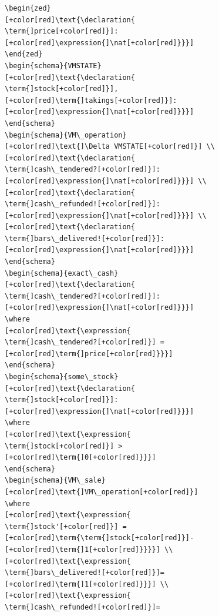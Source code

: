 \begin{figure}[H]
\centering
\begin{minipage}{0.45\textwidth}
\centering
\begin{tiny}
\begin{BVerbatim}[commandchars=+\[\]]
\begin{zed}
[+color[red]\text{\declaration{
\term{]price[+color[red]}]:[+color[red]\expression{]\nat[+color[red]}}}]
\end{zed}
\begin{schema}{VMSTATE}
[+color[red]\text{\declaration{
\term{]stock[+color[red]}], [+color[red]\term{]takings[+color[red]}]:
[+color[red]\expression{]\nat[+color[red]}}}]
\end{schema}
\begin{schema}{VM\_operation}
[+color[red]\text{]\Delta VMSTATE[+color[red]}] \\
[+color[red]\text{\declaration{
\term{]cash\_tendered?[+color[red]}]:[+color[red]\expression{]\nat[+color[red]}}}] \\
[+color[red]\text{\declaration{
\term{]cash\_refunded![+color[red]}]:[+color[red]\expression{]\nat[+color[red]}}}] \\
[+color[red]\text{\declaration{
\term{]bars\_delivered![+color[red]}]:[+color[red]\expression{]\nat[+color[red]}}}]
\end{schema}
\begin{schema}{exact\_cash}
[+color[red]\text{\declaration{
\term{]cash\_tendered?[+color[red]}]:[+color[red]\expression{]\nat[+color[red]}}}]
\where
[+color[red]\text{\expression{
\term{]cash\_tendered?[+color[red]}] = [+color[red]\term{]price[+color[red]}}}]
\end{schema}
\begin{schema}{some\_stock}
[+color[red]\text{\declaration{
\term{]stock[+color[red]}]:[+color[red]\expression{]\nat[+color[red]}}}]
\where
[+color[red]\text{\expression{
\term{]stock[+color[red]}] > [+color[red]\term{]0[+color[red]}}}]
\end{schema}
\begin{schema}{VM\_sale}
[+color[red]\text{]VM\_operation[+color[red]}]
\where
[+color[red]\text{\expression{
\term{]stock'[+color[red]}] = [+color[red]\term{\term{]stock[+color[red]}]-[+color[red]\term{]1[+color[red]}}}}] \\
[+color[red]\text{\expression{
\term{]bars\_delivered![+color[red]}]=[+color[red]\term{]1[+color[red]}}}] \\
[+color[red]\text{\expression{
\term{]cash\_refunded![+color[red]}]= 

\end{BVerbatim}
\end{tiny}
\end{minipage}
\end{figure}
